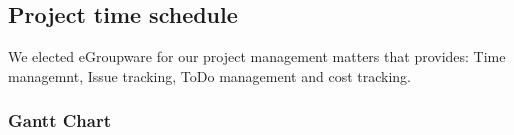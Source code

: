 \subsection{Project time schedule}

We elected eGroupware for our project management matters that provides:
Time managemnt, Issue tracking, ToDo management and cost tracking.

\subsubsection{Gantt Chart}
\begin{figure}[htbp]
  \vspace{-20pt}
  \begin{center}
  \end{center}
  \vspace{-20pt}
\end{figure}
\newpage

